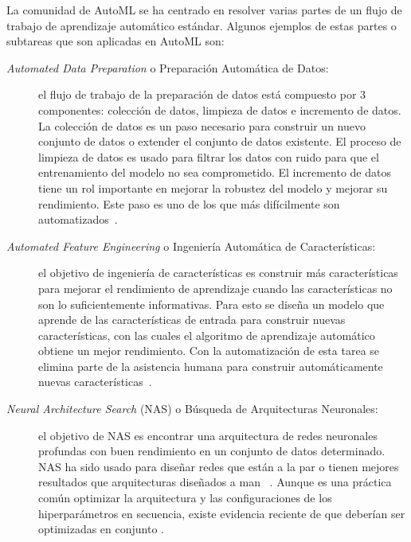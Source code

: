 La comunidad de AutoML se ha centrado en resolver varias partes de un flujo de
trabajo de aprendizaje automático estándar. Algunos ejemplos de estas partes o
subtareas que son aplicadas en AutoML son:

\begin{description}
	\item[\textit{Automated Data Preparation} o Preparación Automática de
    Datos:] el flujo de trabajo de la preparación de datos está compuesto por 
    3 componentes: colección de datos, limpieza de datos e incremento de datos.
    La colección de datos es un paso necesario para construir un nuevo conjunto
    de datos o extender el conjunto de datos existente. El proceso de limpieza
    de datos es usado para filtrar los datos con ruido para que el
    entrenamiento del modelo no sea comprometido. El incremento de datos tiene
    un rol importante en mejorar la robustez del modelo y mejorar su
    rendimiento. Este paso es uno de los que más difícilmente son
    automatizados~.
	
	\item[\textit{Automated Feature Engineering} o Ingeniería Automática de
    Características:] el objetivo de ingeniería de características es construir
    más características para mejorar el rendimiento de aprendizaje cuando las
    características no son lo suficientemente informativas. Para esto se diseña
    un modelo que aprende de las características de entrada para construir
    nuevas características, con las cuales el algoritmo de aprendizaje
    automático obtiene un mejor rendimiento. Con la automatización de esta
    tarea se elimina parte de la asistencia humana para construir
    automáticamente nuevas características~.
	
	\item [\textit{Neural Architecture Search} (NAS) o Búsqueda de
    Arquitecturas Neuronales:] el objetivo de NAS es encontrar una arquitectura
    de redes neuronales profundas con buen rendimiento en un conjunto de datos
    determinado. NAS ha sido usado para diseñar redes que están a la par o
    tienen mejores resultados que arquitecturas diseñados a man
    ~. Aunque es una práctica común
    optimizar la arquitectura y las configuraciones de los hiperparámetros en
    secuencia, existe evidencia reciente de que deberían ser optimizadas en
    conjunto .
\end{description}

